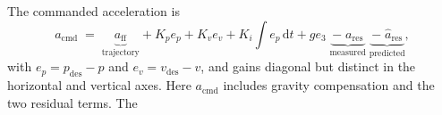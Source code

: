 The commanded acceleration is
%
\begin{equation}
  a_{\mathrm{cmd}}
  \;=\; \underbrace{a_{\mathrm{ff}}}_{\text{trajectory}}
      + K_p e_p + K_v e_v + K_i \!\int\! e_p \,\mathrm{d}t
      + g e_3
      \;\underbrace{-\; a_{\mathrm{res}}}_{\text{measured}}
      \;\underbrace{-\; \hat{a}_{\mathrm{res}}}_{\text{predicted}},
  \label{eq:ctrl-ades}
\end{equation}
%
with $e_p = p_{\mathrm{des}} - p$ and $e_v = v_{\mathrm{des}} - v$, and gains diagonal but distinct
in the horizontal and vertical axes. Here $a_{\mathrm{cmd}}$ includes gravity compensation and the two residual terms. The
